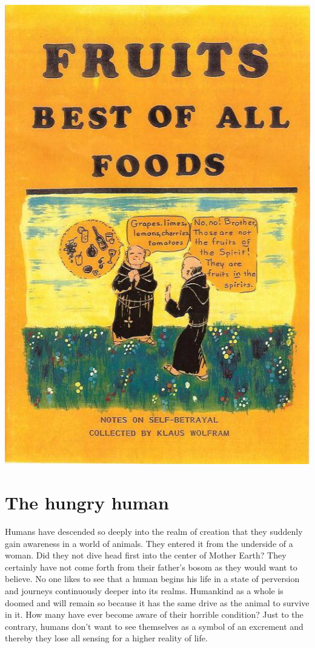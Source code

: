 \documentclass[landscape,twocolumn,letterpaper]{article}
\begin{document}



\includegraphics[height=1.1\textheight,bb= 0 0 529 797]{cover.jpg}


 
\thispagestyle{empty}
\tableofcontents




\section{The hungry human}

Humans have descended so deeply into the realm of creation that they
suddenly gain awareness in a world of animals. They entered it from
the underside of a woman. Did they not dive head first into the center
of Mother Earth? They certainly have not come forth from their
father's bosom as they would want to believe. No one likes to see that
a human begins his life in a state of perversion and journeys
continuously deeper into its realms. Humankind as a whole is doomed
and will remain so because it has the same drive as the animal to
survive in it. How many have ever become aware of their horrible
condition? Just to the contrary, humans don't want to see themselves
as a symbol of an excrement and thereby they lose all sensing for a
higher reality of life.
\end{document}
